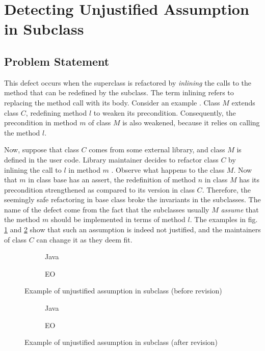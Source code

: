 \section{Detecting Unjustified Assumption in Subclass}
\subsection{Problem Statement}
\label{met:unjustified}
This defect \cite[Section 3.3]{fragilebaseclass} occurs when the superclass is refactored by \textit{inlining} the calls to the method that can be redefined by the subclass. The term inlining refers to replacing the method call with its body. Consider an example . Class $M$ extends class $C$, redefining method $l$ to weaken its precondition. Consequently, the precondition in method $m$ of class $M$ is also weakened, because it relies on calling the method $l$. 

Now, suppose that class $C$ comes from some external library, and class $M$ is defined in the user code. Library maintainer decides to refactor class $C$ by inlining the call to $l$ in method $m$ . Observe what happens to the class $M$. Now that $m$ in class base has an assert, the redefinition of method $n$ in class $M$ has its precondition strengthened as compared to its version in class $C$. Therefore, the seemingly safe refactoring in base class broke the invariants in the subclasses. The name of the defect come from the fact that the subclasses usually $M$ \textit{assume} that the method $m$ should be implemented in terms of method $l$. The examples in fig. \ref{fig:unjustified_before} and \ref{fig:unjustified_after} show that such an assumption is indeed not justified, and the maintainers of class $C$ can change it as they deem fit.

\begin{figure}
    \centering
    \begin{subfigure}{0.4\textwidth}
        
        \caption{Java}
    \end{subfigure}
    \hfill
    \begin{subfigure}{0.4\textwidth}
        
        \caption{EO}
    \end{subfigure}
    \caption{Example of unjustified assumption in subclass (before revision)}
    \label{fig:unjustified_before}
\end{figure}

\begin{figure}
    \centering
    \begin{subfigure}{0.4\textwidth}
        
        \caption{Java}
    \end{subfigure}
    \hfill
    \begin{subfigure}{0.4\textwidth}
        
        \caption{EO}
    \end{subfigure}
    \caption{Example of unjustified assumption in subclass (after revision)}
    \label{fig:unjustified_after}
\end{figure}

